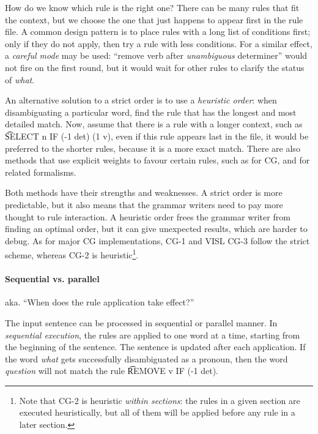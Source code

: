 How do we know which rule is the right one? There can be many rules
that fit the context, but we choose the one that just happens to
appear first in the rule file.  A common design pattern is to place
rules with a long list of conditions first; only if they do not apply,
then try a rule with less conditions. For a similar effect, a
\emph{careful mode} may be used: ``remove verb after
\emph{unambiguous} determiner'' would not fire on the first round, but
it would wait for other rules to clarify the status of \emph{what}.
					
An alternative solution to a strict order is to use a \emph{heuristic
  order}: when disambiguating a particular word, find the rule that
has the longest and most detailed match. Now, assume that there is a
rule with a longer context, such as \t{SELECT n IF (-1 det) (1 v)},
even if this rule appears last in the file, it would be preferred to
the shorter rules, because it is a more exact match.  There are also
methods that use explicit weights to favour certain rules, such as
\cite{pirinen2015} for CG, and
\cite{voutilainen1994designing,oflazer97votingconstraints,silfverberg2009conflict}
for related formalisms.
					
Both methods have their strengths and weaknesses. A strict order is
more predictable, but it also means that the grammar writers need to
pay more thought to rule interaction. A heuristic order frees the
grammar writer from finding an optimal order, but it can give
unexpected results, which are harder to debug.  As for major CG
implementations, CG-1 \cite{karlsson1990cgp} and VISL CG-3
\cite{vislcg3} follow the strict scheme, whereas CG-2
\cite{tapanainen1996} is heuristic\footnote{Note that CG-2 is
  heuristic \emph{within sections}: the rules in a given section are
  executed heuristically, but all of them will be applied before any
  rule in a later section.}.





\paragraph{Sequential vs. parallel}

aka. ``When does the rule application take effect?''

The input sentence can be processed in sequential or parallel manner.
In \emph{sequential execution}, the rules are applied to one word at a
time, starting from the beginning of the sentence. The sentence is
updated after each application. If the word \emph{what} gets
successfully disambiguated as a pronoun, then the word \emph{question}
will not match the rule \t{REMOVE v IF (-1 det)}.


